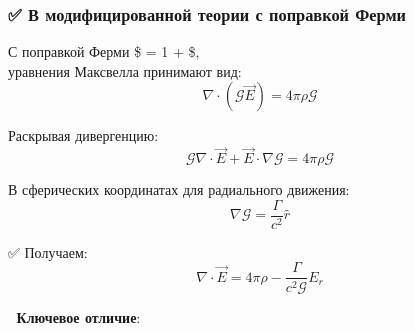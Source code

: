 \documentclass[11pt]{article}
\begin{document}
\subsubsection{✅ В модифицированной теории с поправкой
Ферми}\label{ux432-ux43cux43eux434ux438ux444ux438ux446ux438ux440ux43eux432ux430ux43dux43dux43eux439-ux442ux435ux43eux440ux438ux438-ux441-ux43fux43eux43fux440ux430ux432ux43aux43eux439-ux444ux435ux440ux43cux438}

С поправкой Ферми \$  = 1 +
 \$,\\
уравнения Максвелла принимают вид: \[
\nabla \cdot (\mathcal{G} \vec{E}) = 4\pi \rho \mathcal{G}
\]

Раскрывая дивергенцию: \[
\mathcal{G} \nabla \cdot \vec{E} + \vec{E} \cdot \nabla \mathcal{G} = 4\pi \rho \mathcal{G}
\]

В сферических координатах для радиального движения: \[
\nabla \mathcal{G} = \dfrac{\Gamma}{c^2} \hat{r}
\]

✅ Получаем: \[
\nabla \cdot \vec{E} = 4\pi \rho - \dfrac{\Gamma}{c^2 \mathcal{G}} E_r
\]

📌 \textbf{Ключевое отличие}:
\end{document}
